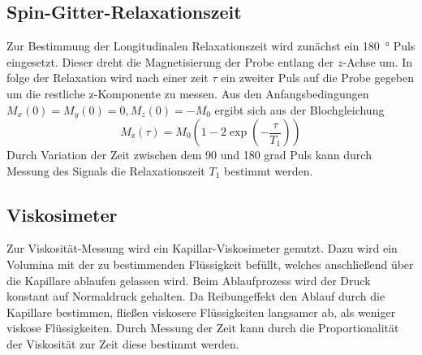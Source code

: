 \subsection{Spin-Gitter-Relaxationszeit}%
\label{sub:spin_gitter_relaxationszeit}
Zur Bestimmung der Longitudinalen Relaxationszeit wird zunächst ein
\SI{180}{\degree}
Puls eingesetzt. 
Dieser dreht die Magnetisierung der Probe entlang der $z$-Achse um.
In folge der Relaxation wird nach einer zeit $\tau$ ein zweiter Puls auf die
Probe gegeben um die restliche z-Komponente zu messen. 
Aus den Anfangsbedingungen $M_x(0) = M_y(0) =0, M_z(0)=-M_0$ ergibt sich aus der
Blochgleichung 
\begin{equation}
		\label{eq:magn}
		M_\text{z}(\tau) = M_0 \left(1 - 2 \exp \left(- \frac{\tau}{T_1} \right)
		\right)
\end{equation}
Durch Variation der Zeit zwischen dem 90 und 180 grad Puls kann durch Messung
des Signals die Relaxationszeit $T_1$ bestimmt werden.

\subsection{Viskosimeter}%
\label{sub:viskosimeter}
Zur Viskosität-Messung wird ein Kapillar-Viskosimeter genutzt. 
Dazu wird ein Volumina mit der zu bestimmenden Flüssigkeit befüllt, welches
anschließend über die Kapillare ablaufen gelassen wird.
Beim Ablaufprozess wird der Druck konstant auf Normaldruck gehalten. 
Da Reibungeffekt den Ablauf durch die Kapillare bestimmen, fließen viskosere
Flüssigkeiten langsamer ab, als weniger viskose Flüssigkeiten.
Durch Messung der Zeit kann durch die Proportionalität der Viskosität zur Zeit
diese bestimmt werden.
